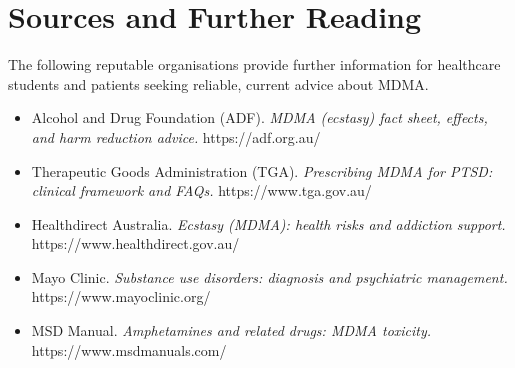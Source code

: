 \section*{Sources and Further Reading}
The following reputable organisations provide further information for healthcare students and patients seeking reliable, current advice about MDMA.

\begin{itemize}
    \item Alcohol and Drug Foundation (ADF). \textit{MDMA (ecstasy) fact sheet, effects, and harm reduction advice.} https://adf.org.au/
    \item Therapeutic Goods Administration (TGA). \textit{Prescribing MDMA for PTSD: clinical framework and FAQs.} https://www.tga.gov.au/
    \item Healthdirect Australia. \textit{Ecstasy (MDMA): health risks and addiction support.} https://www.healthdirect.gov.au/
    \item Mayo Clinic. \textit{Substance use disorders: diagnosis and psychiatric management.} https://www.mayoclinic.org/
    \item MSD Manual. \textit{Amphetamines and related drugs: MDMA toxicity.} https://www.msdmanuals.com/
\end{itemize}
